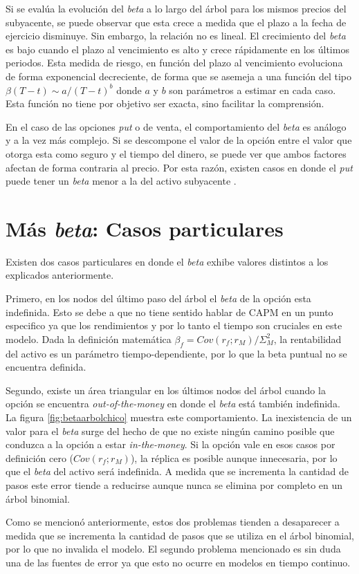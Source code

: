 Si se evalúa la evolución del \textit{beta} a lo largo del árbol para los mismos precios del subyacente, se puede observar que esta crece a medida que el plazo a la fecha de ejercicio disminuye. Sin embargo, la relación no es lineal. El crecimiento del \textit{beta} es bajo cuando el plazo al vencimiento es alto y crece rápidamente en los últimos periodos. Esta medida de riesgo, en función del plazo al vencimiento evoluciona de forma exponencial decreciente, de forma que se asemeja a una función del tipo $\beta(T-t) \sim a/(T-t)^b$ donde $a$ y $b$ son parámetros a estimar en cada caso. Esta función no tiene por objetivo ser exacta, sino facilitar la comprensión.

En el caso de las opciones \textit{put} o de venta, el comportamiento del \textit{beta} es análogo y a la vez más complejo. Si se descompone el valor de la opción entre el valor que otorga esta como seguro y el tiempo del dinero, se puede ver que ambos factores afectan de forma contraria al precio. Por esta razón, existen casos en donde el \textit{put} puede tener un \textit{beta} menor a la del activo subyacente \cite{optionsmarkets}.


\section{Más \textit{beta}: Casos particulares}

Existen dos casos particulares en donde el \textit{beta} exhibe valores distintos a los explicados anteriormente. 

Primero, en los nodos del último paso del árbol el \textit{beta} de la opción esta indefinida. Esto se debe a que no tiene sentido hablar de CAPM en un punto especifico ya que los rendimientos y por lo tanto el tiempo son cruciales en este modelo. Dada la definición matemática $\beta_f = Cov(r_f; r_M) / \Sigma_M^2$, la rentabilidad del activo es un parámetro tiempo-dependiente, por lo que la beta puntual no se encuentra definida.

Segundo, existe un área triangular en los últimos nodos del árbol cuando la opción se encuentra \textit{out-of-the-money} en donde el \textit{beta} está también indefinida. La figura \ref{fig:betaarbolchico} muestra este comportamiento. La inexistencia de un valor para el \textit{beta} surge del hecho de que no existe ningún camino posible que conduzca a la opción a estar \textit{in-the-money}. Si la opción vale en esos casos por definición cero ($Cov(r_f; r_M)$), la réplica es posible aunque innecesaria, por lo que el \textit{beta} del activo será indefinida. A medida que se incrementa la cantidad de pasos este error tiende a reducirse aunque nunca se elimina por completo en un árbol binomial.

Como se mencionó anteriormente, estos dos problemas tienden a desaparecer a medida que se incrementa la cantidad de pasos que se utiliza en el árbol binomial, por lo que no invalida el modelo. El segundo problema mencionado es sin duda una de las fuentes de error ya que esto no ocurre en modelos en tiempo continuo.





